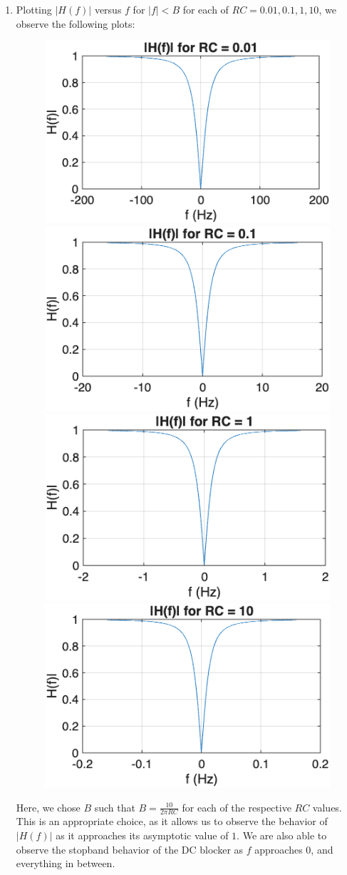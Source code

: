 \documentclass[11pt]{article}
\begin{document}
\begin{enumerate}[label=\textbf{\alph*)}, leftmargin=2.6em]
    \item Plotting $|H(f)|$ versus $f$ for $|f|<B$ for each of $RC=0.01,0.1,1,10$, we
    observe the following plots:
    \begin{figure} [H]
        \centering
        \includegraphics[width=0.4\linewidth]{plot2.png}
        \includegraphics[width=0.4\linewidth]{plot3.png}
        \includegraphics[width=0.4\linewidth]{plot4.png}
        \includegraphics[width=0.4\linewidth]{plot5.png}
    \end{figure}
    Here, we chose $B$ such that $B=\frac{10}{2\pi RC}$ for each of the
    respective $RC$ values. This is an appropriate choice, as it allows us to
    observe the behavior of $|H(f)|$ as it approaches its asymptotic value
    of $1$. We are also able to observe the stopband behavior of the DC blocker
    as $f$ approaches $0$, and everything in between.


\end{enumerate}
\end{document}
